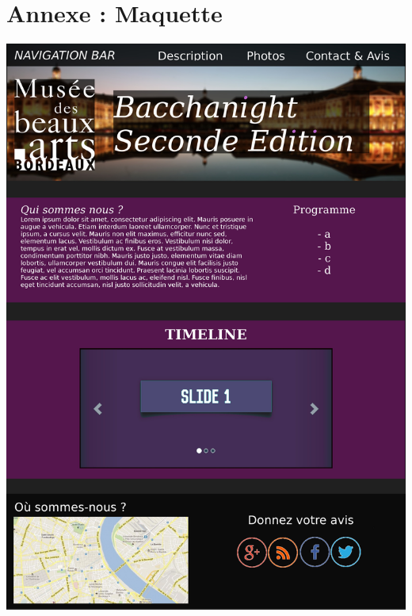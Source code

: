 \documentclass[11pt]{report}
\begin{document}

\newpage

\section{Annexe : Maquette}

\vspace{0.4cm}
\includegraphics[scale=0.75]{maquette.jpg}
\end{document}
